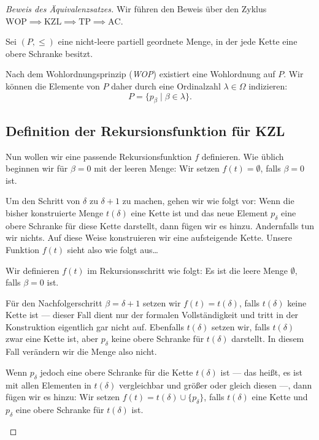 \begin{proof}[Beweis des Äquivalenzsatzes]
Wir führen den Beweis über den Zyklus $\text{WOP} \implies \text{KZL} \implies \text{TP} \implies \text{AC}$.

\begin{math-stroke}
Sei $(P, \le)$ eine nicht-leere partiell geordnete Menge, in der jede Kette eine obere Schranke besitzt. 

Nach dem Wohlordnungsprinzip (\emph{WOP}) existiert eine Wohlordnung auf $P$. Wir können die Elemente von $P$ daher durch eine Ordinalzahl $\lambda \in \Omega$ indizieren:
\[
P = \{p_\beta \mid \beta \in \lambda\}.
\]
\end{math-stroke}

\subsection{Definition der Rekursionsfunktion für KZL}
\begin{spoken-clean}[01:13:04 - 01:15:50]
Nun wollen wir eine passende Rekursionsfunktion $f$ definieren. Wie üblich beginnen wir für $\beta = 0$ mit der leeren Menge: Wir setzen $f(t) = \emptyset$, falls $\beta = 0$ ist.

Um den Schritt von $\delta$ zu $\delta+1$ zu machen, gehen wir wie folgt vor: Wenn die bisher konstruierte Menge $t(\delta)$ eine Kette ist und das neue Element $p_\delta$ eine obere Schranke für diese Kette darstellt, dann fügen wir es hinzu. Andernfalls tun wir nichts. Auf diese Weise konstruieren wir eine aufsteigende Kette. Unsere Funktion $f(t)$ sieht also wie folgt aus\dots
\end{spoken-clean}

\begin{spoken-clean}[01:15:50 - 01:18:35]
Wir definieren $f(t)$ im Rekursionsschritt wie folgt: Es ist die leere Menge $\emptyset$, falls $\beta = 0$ ist.

Für den Nachfolgerschritt $\beta = \delta + 1$ setzen wir $f(t) = t(\delta)$, falls $t(\delta)$ keine Kette ist --- dieser Fall dient nur der formalen Vollständigkeit und tritt in der Konstruktion eigentlich gar nicht auf. Ebenfalls $t(\delta)$ setzen wir, falls $t(\delta)$ zwar eine Kette ist, aber $p_\delta$ keine obere Schranke für $t(\delta)$ darstellt. In diesem Fall verändern wir die Menge also nicht.

Wenn $p_\delta$ jedoch eine obere Schranke für die Kette $t(\delta)$ ist --- das heißt, es ist mit allen Elementen in $t(\delta)$ vergleichbar und größer oder gleich diesen ---, dann fügen wir es hinzu: Wir setzen $f(t) = t(\delta) \cup \{p_\delta\}$, falls $t(\delta)$ eine Kette und $p_\delta$ eine obere Schranke für $t(\delta)$ ist.


\end{spoken-clean}
\end{proof}
